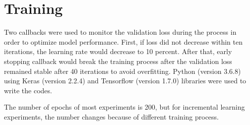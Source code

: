\section{Training}
Two callbacks were used to monitor the validation loss during the process in order to optimize model performance. 
First, if loss did not decrease within ten iterations, the learning rate would decrease to 10 percent. After that, early stopping callback would break the training process after the validation loss remained stable after 40 iterations to avoid overfitting. Python (version 3.6.8) using Keras (version 2.2.4) and Tensorflow (version 1.7.0) libraries were used to write the codes.

The number of epochs of most experiments is 200, but for incremental learning experiments, the number changes because of different training process. \cite{liu2020deep}

